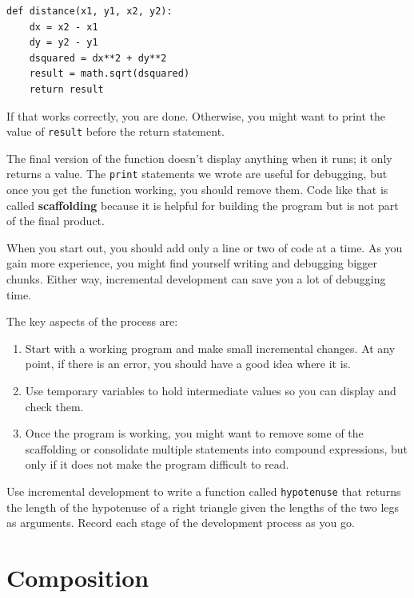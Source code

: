 \documentclass[10pt]{book}
\begin{document}
\begin{CJK}{UTF8}{gbsn}
\begin{verbatim}
def distance(x1, y1, x2, y2):
    dx = x2 - x1
    dy = y2 - y1
    dsquared = dx**2 + dy**2
    result = math.sqrt(dsquared)
    return result
\end{verbatim}
%
If that works correctly, you are done.  Otherwise, you might
want to print the value of {\tt result} before the return
statement.

The final version of the function doesn't display anything when it
runs; it only returns a value.  The {\tt print} statements we wrote
are useful for debugging, but once you get the function working, you
should remove them.  Code like that is called {\bf scaffolding}
because it is helpful for building the program but is not part of the
final product.

When you start out, you should add only a line or two of code at a
time.  As you gain more experience, you might find yourself writing
and debugging bigger chunks.  Either way, incremental development
can save you a lot of debugging time.

The key aspects of the process are:

\begin{enumerate}

\item Start with a working program and make small incremental changes. 
At any point, if there is an error, you should have a good idea
where it is.

\item Use temporary variables to hold intermediate values so you can
display and check them.

\item Once the program is working, you might want to remove some of
the scaffolding or consolidate multiple statements into compound
expressions, but only if it does not make the program difficult to
read.

\end{enumerate}

\begin{exercise}

Use incremental development to write a function
called {\tt hypotenuse} that returns the length of the hypotenuse of a
right triangle given the lengths of the two legs as arguments.
Record each stage of the development process as you go.
\end{exercise}


\section{Composition}


\end{CJK}
\end{document}
